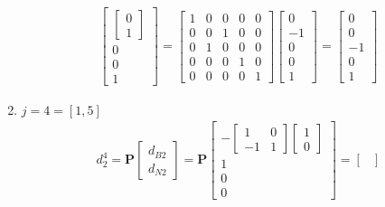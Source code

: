 \documentclass[11pt]{article}
\begin{document}
\begin{enumerate}
\begin{align*}
\begin{bmatrix}
        \begin{bmatrix}
            0 \\ 1
        \end{bmatrix} \\
        0 \\ 0 \\ 1
      \end{bmatrix}
      = 
      \begin{bmatrix}
        1 & 0 & 0 & 0 & 0 \\
        0 & 0 & 1 & 0 & 0 \\
        0 & 1 & 0 & 0 & 0 \\
        0 & 0 & 0 & 1 & 0 \\
        0 & 0 & 0 & 0 & 1
      \end{bmatrix}
      \begin{bmatrix}
        0 \\ -1 \\ 0 \\ 0 \\ 1
      \end{bmatrix}
      =
      \begin{bmatrix}
        0 \\ 0 \\ -1 \\ 0 \\ 1 
      \end{bmatrix}
    \end{align*}
    \item $j=4 = [1,5]$
    \begin{align*} 
        d_2^4 = \textbf{P}
      \begin{bmatrix}
         d_{B2} \\ d_{N2}
      \end{bmatrix}
      =
      \textbf{P}
      \begin{bmatrix}
        -
        \begin{bmatrix}
         1 & 0 \\ -1 & 1   
        \end{bmatrix}
        \begin{bmatrix}
            1 \\ 0
        \end{bmatrix} \\
        1 \\ 0 \\ 0
      \end{bmatrix}
      = 
      \begin{bmatrix}

\end{bmatrix}
\end{align*}
\end{enumerate}
\end{document}
